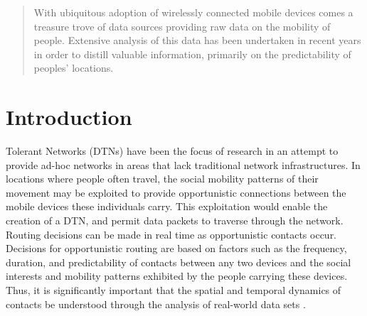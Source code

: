 \documentclass[journal]{IEEEtran}
\begin{document}




\maketitle

\begin{abstract}
With ubiquitous adoption of wirelessly connected mobile devices comes a treasure trove of data sources providing raw data on the mobility of people. Extensive analysis of this data has been undertaken in recent years in order to distill valuable information, primarily on the predictability of peoples' locations.
\end{abstract}

%
\IEEEpeerreviewmaketitle



\section{Introduction}
% 
% 
% 
% 

 Tolerant Networks (DTNs) have been the focus of research in an attempt to provide ad-hoc networks in areas that lack traditional network infrastructures. In locations where people often travel, the social mobility patterns of their movement may be exploited to provide opportunistic connections between the mobile devices these individuals carry. This exploitation would enable the creation of a DTN, and permit data packets to traverse through the network. Routing decisions can be made in real time as opportunistic contacts occur. Decisions for opportunistic routing are based on factors such as the frequency, duration, and predictability of contacts between any two devices and the social interests and mobility patterns exhibited by the people carrying these devices. Thus, it is significantly important that the spatial and temporal dynamics of contacts be understood through the analysis of real-world data sets \cite{isaacman_human_2012}.
\end{document}
